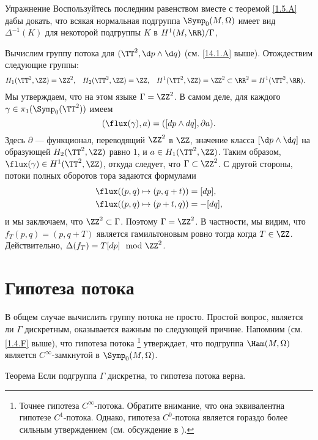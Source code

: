 \begin{ex}{Упражнение}\label{14.1.B}
Воспользуйтесь последним равенством вместе с теоремой \ref{1.5.A} дабы докать, что всякая нормальная подгруппа $\Symp_0(M,\Omega)$ имеет вид $\Delta^{-1}(K)$ для некоторой подгруппы $K$ в $H^1(M, \RR)/\Gamma$,
\end{ex}

Вычислим группу потока для $(\TT^2,\d p\wedge \d q)$ (см. \ref{14.1.A} выше).
Отождествим следующие группы: 
\begin{align*}
H_1(\TT^2,\ZZ)&=\ZZ^2,
&
H_2(\TT^2,\ZZ)&=\ZZ,
&
H^1(\TT^2,\ZZ)&=\ZZ^2
\subset
\RR^2=
H^1(\TT^2,\RR).
\end{align*}
Мы утверждаем, что на этом языке $\Gamma = \ZZ^2$.
В самом деле, для каждого $\gamma\in\pi_1(\Symp_0(\TT^2))$ имеем 
\[(\flux(\gamma), a) = ([dp \wedge dq], \partial a).\]
Здесь $\partial$ --- функционал, переводящий $\ZZ^2$ в $\ZZ$, значение
класса $[\d p \wedge \d q]$ на образующей $H_2 (\TT^2,\ZZ)$ равно $1$,
и $a \in H_1 (\TT^2, \ZZ)$. 
Таким образом, $\flux(\gamma)\in H^1(\TT^2,\ZZ)$, откуда следует, что
$\Gamma\subset \ZZ^2$.
С другой стороны, потоки полных оборотов тора задаются формулами 
\begin{align*}
\flux( (p, q) \mapsto (p , q+ t))
&=
[dp],
\\
\flux( (p, q) \mapsto (p+ t , q))
&=
-[dq],
\end{align*}
и мы заключаем, что $\ZZ^2 \subset  \Gamma$.
Поэтому $\Gamma = \ZZ^2$.
В частности, мы видим, что $f_T(p, q) = (p, q + T)$ является
гамильтоновым ровно тогда когда $T \in \ZZ$. 
Действительно, $\Delta(f_T) = T[dp] \mod{\ZZ^2}$.

\section{Гипотеза потока}

В общем случае вычислить группу потока не просто. 
Простой вопрос, является ли $\Gamma$ дискретным, оказывается важным по
следующей причине. 
Напомним (см. \ref{1.4.F} выше), что гипотеза потока%
\footnote{Точнее гипотеза $C^\infty$-потока.
Обратите внимание, что она эквивалентна гипотезе $C^1$-потока.
Однако, гипотеза $C^0$-потока является гораздо более сильным утверждением (см. обсуждение в \cite{LMP1}).}
утверждает, что подгруппа $\Ham(M,\Omega)$ является $C^\infty$-замкнутой в $\Symp_0(M,\Omega)$.

\begin{thm}{Теорема}\label{14.2.A}
Если подгруппа $\Gamma$ дискретна, то гипотеза потока верна. 
\end{thm}

